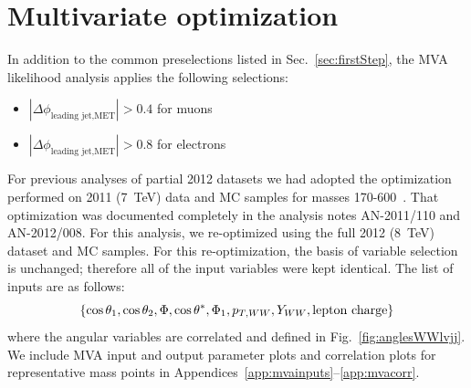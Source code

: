 \section{Multivariate optimization}
\label{sec:mvaoptimization}

In addition to the common preselections listed in Sec.~\ref{sec:firstStep}, the
MVA likelihood analysis applies the following selections:

\begin{itemize}
\item $|\Delta\phi_{\textrm{leading jet,MET}}| > 0.4$ for muons
\item $|\Delta\phi_{\textrm{leading jet,MET}}| > 0.8$ for electrons
\end{itemize}

For previous analyses of partial 2012 datasets we had adopted the
optimization performed on 2011 (7~TeV) data and MC samples for masses
170-600~\GeV.  That optimization was documented completely in the
analysis notes AN-2011/110 and AN-2012/008. For this analysis, we
re-optimized using the full 2012 (8~TeV) dataset and MC samples. For
this re-optimization, the basis of variable selection is unchanged;
therefore all of the input variables were kept identical. The list of
inputs are as follows:
\begin{equation}
\{ \cos\theta_1, \cos\theta_2, \Phi, \cos\theta^{\ast}, \Phi_1, p_{T,WW}, Y_{WW}, {\rm lepton~charge}\}
\end{equation}
where the angular variables are correlated and defined in
Fig.~\ref{fig:anglesWWlvjj}. We include MVA input and output parameter
plots and correlation plots for representative mass points in
Appendices~\ref{app:mvainputs}--\ref{app:mvacorr}.



